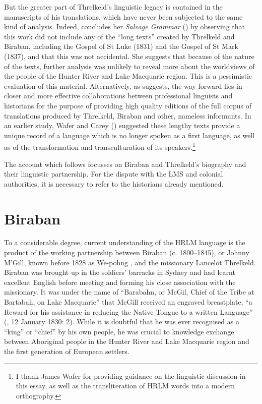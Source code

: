 But the greater part of Threlkeld’s linguistic legacy is contained in the manuscripts of his translations, which have never been subjected to the same kind of analysis. Indeed, \citeauthor{lissarrague_salvage_2006} concludes her \textit{Salvage Grammar} (\citeyear[107]{lissarrague_salvage_2006}) by observing that this work did not include any of the “long texts” created by Threlkeld and Biraban, including the Gospel of St Luke (1831) and the Gospel of St Mark (1837), and that this was not accidental. She suggests that because of the nature of the texts, further analysis was unlikely to reveal more about the worldviews of the people of the Hunter River and Lake Macquarie region. This is a pessimistic evaluation of this material. Alternatively, as \citet{rademaker_why_2016} suggests, the way forward lies in closer and more effective collaborations between professional linguists and historians for the purpose of providing high quality editions of the full corpus of translations produced by Threlkeld, Biraban and other, nameless informants. In an earlier study, Wafer and Carey (\citeyear{wafer_waiting_2011}) suggested these lengthy texts provide a unique record of a language which is no longer spoken as a first language, as well as of the transformation and transculturation of its speakers.\footnote{I thank James Wafer for providing guidance on the linguistic discussion in this essay, as well as the transliteration of HRLM words into a modern orthography.}

The account which follows focusses on Biraban and Threlkeld’s biography and their linguistic partnership. For the dispute with the LMS and colonial authorities, it is necessary to refer to the historians already mentioned.

\section{Biraban}

To a considerable degree, current understanding of the HRLM language is the product of the working partnership between Biraban (c. 1800--1845), or Johnny M’Gill, known before 1828 as We-pohng \citep[31, n. 39]{gunson_australian_1974a}, and the missionary Lancelot Threlkeld. Biraban was brought up in the soldiers’ barracks in Sydney and had learnt excellent English before meeting and forming his close association with the missionary. It was under the name of “Barabahn, or McGil, Chief of the Tribe at Bartabah, on Lake Macquarie” that McGill received an engraved breastplate, “a Reward for his assistance in reducing the Native Tongue to a written Language” (\textit{}, 12 January 1830: 2). While it is doubtful that he was ever recognised as a “king” or “chief” by his own people, he was crucial to knowledge exchange between Aboriginal people in the Hunter River and Lake Macquarie region and the first generation of European settlers.

